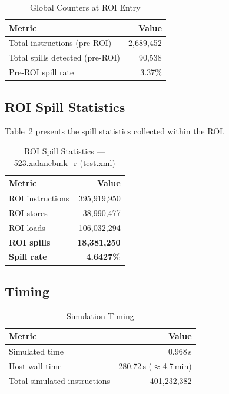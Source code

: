\documentclass[conference]{IEEEtran}
\begin{document}
\begin{table}[H]
\centering
\caption{Global Counters at ROI Entry}
\label{tab:preroi}
\begin{tabular}{lr}
\toprule
\textbf{Metric} & \textbf{Value} \\
\midrule
Total instructions (pre-ROI) & 2,689,452 \\
Total spills detected (pre-ROI) & 90,538 \\
Pre-ROI spill rate & 3.37\% \\
\bottomrule
\end{tabular}
\end{table}

\subsection{ROI Spill Statistics}

Table~\ref{tab:roi} presents the spill statistics collected within
the ROI.

\begin{table}[H]
\centering
\caption{ROI Spill Statistics --- 523.xalancbmk\_r (test.xml)}
\label{tab:roi}
\begin{tabular}{lr}
\toprule
\textbf{Metric} & \textbf{Value} \\
\midrule
ROI instructions         & 395,919,950 \\
ROI stores               &  38,990,477 \\
ROI loads                & 106,032,294 \\
\midrule
\textbf{ROI spills}      & \textbf{18,381,250} \\
\textbf{Spill rate}      & \textbf{4.6427\%} \\
\bottomrule
\end{tabular}
\end{table}

\subsection{Timing}

\begin{table}[H]
\centering
\caption{Simulation Timing}
\label{tab:timing}
\begin{tabular}{lr}
\toprule
\textbf{Metric} & \textbf{Value} \\
\midrule
Simulated time           & 0.968\,s \\
Host wall time           & 280.72\,s ($\approx$4.7\,min) \\
Total simulated instructions & 401,232,382 \\
\bottomrule
\end{tabular}
\end{table}
\end{document}
